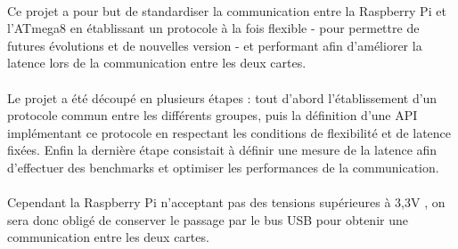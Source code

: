 \paragraph{}
Ce projet a pour but de standardiser la communication entre la Raspberry Pi et
l'ATmega8 en établissant un protocole à la fois flexible - pour permettre de
futures évolutions et de nouvelles version - et performant afin d'améliorer la
latence lors de la communication entre les deux cartes.

\paragraph{}
Le projet a été découpé en plusieurs étapes : tout d'abord l'établissement
d'un protocole commun entre les différents groupes, puis la définition d'une
API implémentant ce protocole en respectant les conditions de flexibilité et
de latence fixées. Enfin la dernière étape consistait à définir une mesure de
la latence afin d'effectuer des benchmarks et optimiser les performances de la
communication.

\paragraph{}
Cependant la Raspberry Pi n'acceptant pas des tensions supérieures à 3,3V , on
sera donc obligé de conserver le passage par le bus USB pour obtenir une
communication entre les deux cartes.
